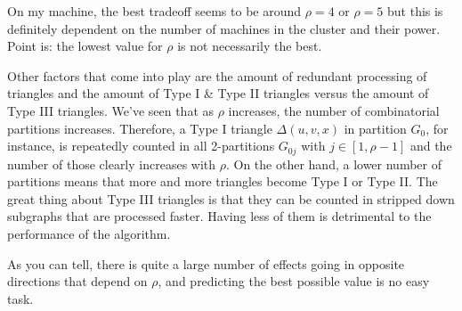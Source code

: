 \documentclass[paper=a4, fontsize=11pt]{scrartcl}
\begin{document}
On my machine, the best tradeoff seems to be around $\rho=4$ or $\rho=5$ but
this is definitely dependent on the number of machines in the cluster and their
power. Point is: the lowest value for $\rho$ is not necessarily the best.

Other factors that come into play are the amount of redundant processing of
triangles and the amount of Type I \& Type II triangles versus the amount of
Type III triangles. We've seen that as $\rho$ increases, the number of
combinatorial partitions increases. Therefore, a Type I triangle $\Delta(u,v,x)$
in partition $G_0$, for instance, is repeatedly counted in all 2-partitions
$G_{0j}$ with $j\in[1,\rho-1]$ and the number of those clearly increases with
$\rho$. On the other hand, a lower number of partitions means that more and more
triangles become Type I or Type II. The great thing about Type III triangles is
that they can be counted in stripped down subgraphs that are processed faster.
Having less of them is detrimental to the performance of the algorithm.

As you can tell, there is quite a large number of effects going in opposite
directions that depend on $\rho$, and predicting the best possible value is no
easy task.
\end{document}
